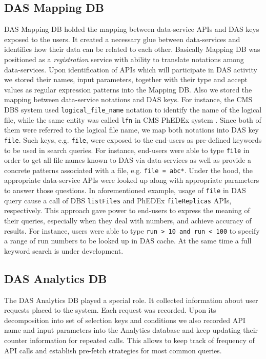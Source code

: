 \documentclass[1p,times]{elsarticle}
\begin{document}
\subsection{DAS Mapping DB}
DAS Mapping DB holded the mapping between data-service APIs and DAS keys exposed to
the users. It created a necessary glue between data-services and identifies
how their data can be related to each other. Basically Mapping DB was positioned 
as a {\it registration} service with ability to translate notations among data-services.
Upon identification of APIs which will participate in DAS activity 
we stored their names, input parameters, together with their type and accept 
values as regular expression patterns into the Mapping DB. 
Also we stored the mapping between data-service notations and DAS keys. 
For instance, the CMS DBS system \cite{DBS}
used \verb+logical_file_name+ notation to identify the name of the
logical file, while the same entity was called \verb+lfn+ 
in CMS PhEDEx system \cite{PhEDEx}.
Since both of them were referred to the logical file name, 
we map both notations into DAS key \verb+file+.
Such keys, e.g. \verb+file+, were exposed to the end-users as pre-defined keywords to
be used in search queries. For instance, end-users were able to type \verb+file+ in
order to get all file names known to DAS via data-services as well as
provide a concrete patterns associated with a file, e.g. \verb+file = abc*+.
Under the hood, the appropriate data-service APIs were looked up along with appropriate
parameters to answer those questions. In aforementioned example, 
usage of \verb+file+ in DAS query cause a call of DBS 
\verb+listFiles+ and PhEDEx \verb+fileReplicas+ APIs, respectively.
This approach gave power to end-users to express the meaning of their queries, especially
when they deal with numbers, and achieve accuracy of results. 
For instance, users were able to type \verb+run > 10 and run < 100+
to specify a range of run numbers to be looked up in DAS cache. At the same time
a full keyword search is under development.

\subsection{DAS Analytics DB}
The DAS Analytics DB played a special role. It collected information
about user requests placed to the system. Each request was recorded. Upon its
decomposition into set of selection keys and conditions we also recorded
API name and input parameters into the Analytics database and 
keep updating their counter information for repeated calls. 
This allows to keep track of frequency of API calls and establish 
pre-fetch strategies for most common queries.
\end{document}
